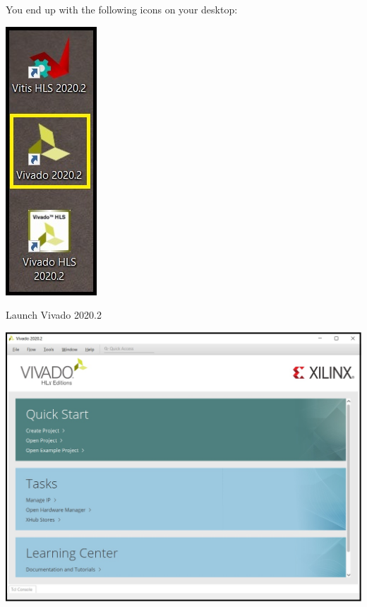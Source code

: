 \begin{minipage}{\linewidth}
  You end up with the following icons on your desktop:
  \\
  \begin{center}
    \includegraphics[width=0.2\linewidth]{images/VivadoInstimg020.jpg}
  \end{center}
\end{minipage}

\begin{minipage}{\linewidth}
  Launch Vivado 2020.2
  \\
  \begin{center}
    \includegraphics[width=0.7\linewidth]{images/VivadoInstimg021.jpg}
  \end{center}
\end{minipage}

